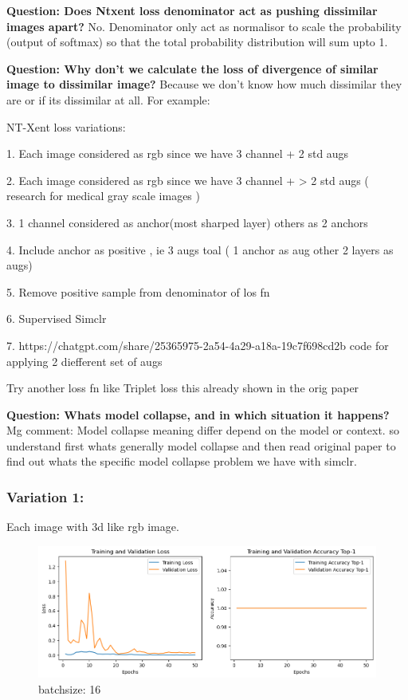 \documentclass[12pt,twoside,a4paper,parskip]{scrbook} %
\begin{document}
\textbf{Question: Does Ntxent loss denominator act as pushing dissimilar images apart?}
No. Denominator only act as normalisor to scale the probability (output of softmax) so that the total probability distribution will sum upto 1. 

\textbf{Question: Why don’t we calculate the loss of divergence of similar image to dissimilar image?}
 Because we don’t know how much dissimilar they are or if its dissimilar at all. For example: 

NT-Xent loss variations:

1. Each image considered as rgb since we have 3 channel + 2 std augs

2. Each image considered as rgb since we have 3 channel + > 2 std augs ( research for medical gray scale images )

3. 1 channel considered as anchor(most sharped layer) others as 2 anchors

4. Include anchor as positive , ie 3 augs  toal ( 1 anchor as aug other 2 layers as augs)

5. Remove positive sample from denominator of los fn

6. Supervised Simclr

7. https://chatgpt.com/share/25365975-2a54-4a29-a18a-19c7f698cd2b
code for applying 2 diefferent set of augs

Try another loss fn like Triplet loss this already shown in the orig paper

\textbf{Question: Whats model collapse, and in which situation it happens?}
Mg comment: Model collapse meaning differ depend on the model or context. so understand first whats generally model collapse and then read original paper to find out whats the specific model collapse problem we have with simclr.
\subsubsection{Variation 1:}
Each image with 3d like rgb image.

\begin{figure}[H]
  \centering
  \includegraphics[width=0.9\linewidth]{figures/image.png} %
  \caption{batchsize: 16}
  \label{fig:batch 16}
\end{figure}
\end{document}
